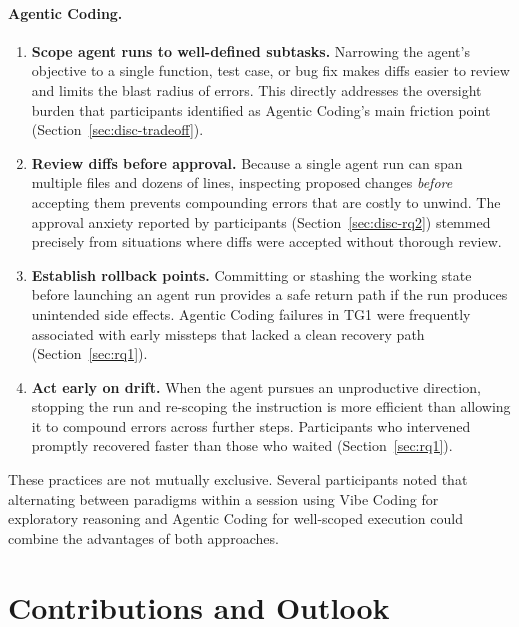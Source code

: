 \paragraph{Agentic Coding.}

\begin{enumerate}

  \item \textbf{Scope agent runs to well-defined subtasks.} Narrowing the agent's objective to a single function, test case, or bug fix makes diffs easier to review and limits the blast radius of errors. This directly addresses the oversight burden that participants identified as Agentic Coding's main friction point (Section~\ref{sec:disc-tradeoff}).

  \item \textbf{Review diffs before approval.} Because a single agent run can span multiple files and dozens of lines, inspecting proposed changes \emph{before} accepting them prevents compounding errors that are costly to unwind. The approval anxiety reported by participants (Section~\ref{sec:disc-rq2}) stemmed precisely from situations where diffs were accepted without thorough review.

  \item \textbf{Establish rollback points.} Committing or stashing the working state before launching an agent run provides a safe return path if the run produces unintended side effects. Agentic Coding failures in TG1 were frequently associated with early missteps that lacked a clean recovery path (Section~\ref{sec:rq1}).

  \item \textbf{Act early on drift.} When the agent pursues an unproductive direction, stopping the run and re-scoping the instruction is more efficient than allowing it to compound errors across further steps. Participants who intervened promptly recovered faster than those who waited (Section~\ref{sec:rq1}).

\end{enumerate}

These practices are not mutually exclusive. Several participants noted that alternating between paradigms within a session using Vibe Coding for exploratory reasoning and Agentic Coding for well-scoped execution could combine the advantages of both approaches.


\section{Contributions and Outlook}

